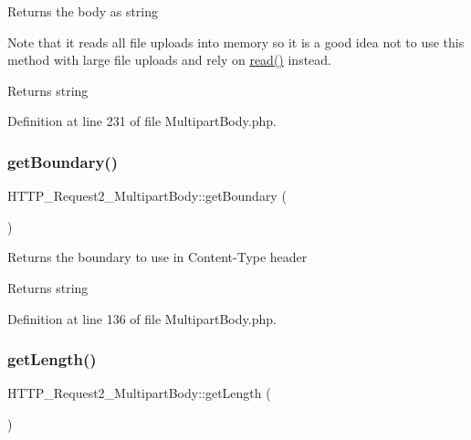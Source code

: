 Returns the body as string

Note that it reads all file uploads into memory so it is a good idea not to use this method with large file uploads and rely on \hyperlink{classHTTP__Request2__MultipartBody_aa392b34f91cbaf97962b7f77ea287cad}{read()} instead.

\begin{DoxyReturn}{Returns}
string 
\end{DoxyReturn}


Definition at line 231 of file Multipart\+Body.\+php.

\hypertarget{classHTTP__Request2__MultipartBody_a67b4cebe7c8e77040d0c8961aa2b9aad}{}\label{classHTTP__Request2__MultipartBody_a67b4cebe7c8e77040d0c8961aa2b9aad} 
\subsubsection{\texorpdfstring{get\+Boundary()}{getBoundary()}}
{\footnotesize\ttfamily H\+T\+T\+P\+\_\+\+Request2\+\_\+\+Multipart\+Body\+::get\+Boundary (\begin{DoxyParamCaption}{ }\end{DoxyParamCaption})}

Returns the boundary to use in Content-\/\+Type header

\begin{DoxyReturn}{Returns}
string 
\end{DoxyReturn}


Definition at line 136 of file Multipart\+Body.\+php.

\hypertarget{classHTTP__Request2__MultipartBody_ad363b71daa46b8fc283bbe35c0c822c8}{}\label{classHTTP__Request2__MultipartBody_ad363b71daa46b8fc283bbe35c0c822c8} 
\subsubsection{\texorpdfstring{get\+Length()}{getLength()}}
{\footnotesize\ttfamily H\+T\+T\+P\+\_\+\+Request2\+\_\+\+Multipart\+Body\+::get\+Length (\begin{DoxyParamCaption}{ }\end{DoxyParamCaption})}

